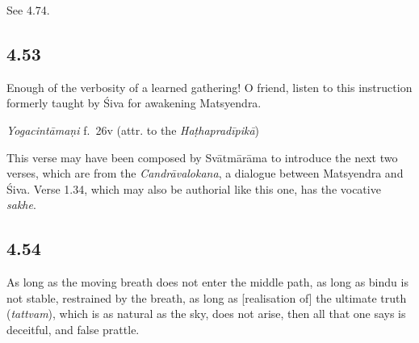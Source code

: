 \begin{ekdosis}
\begin{philcomm}[hp04_052_5]
See 4.74.
\end{philcomm}

\subsection*{4.53}
\begin{translation}[hp04_053]
Enough of the verbosity of a learned gathering! O friend, listen to this instruction formerly taught by Śiva for awakening Matsyendra.
\end{translation}



\begin{testimonia}[hp04_053]
\emph{Yogacintāmaṇi} f.~26v (attr. to the \emph{Haṭhapradīpikā})
\begin{versinnote}
\end{versinnote}
\end{testimonia}

\begin{philcomm}[hp04_053]
This verse may have been composed by Svātmārāma to introduce the next two verses, which are from the \emph{Candrāvalokana}, a dialogue between Matsyendra and Śiva. Verse 1.34, which may also be authorial like this one, has the vocative \emph{sakhe}.
\end{philcomm}

\subsection*{4.54}
\begin{translation}[hp04_054]
As long as the moving breath does not enter the middle path, as long as bindu is not stable, restrained by the breath, as long as [realisation of] the ultimate truth (\emph{tattvam}), which is as natural as the sky, does not arise, then all that one says is deceitful, and false prattle.
\end{translation}%


\end{ekdosis}
